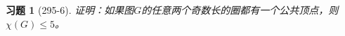 \documentclass{article}
\begin{document}
\begin{CJK}{UTF8}{gbsn}
  \newtheorem*{Exercise}{习题}
  \huge
\begin{Exercise}[295-6]
  证明：如果图$G$的任意两个奇数长的圈都有一个公共顶点，则$\chi (G) \leq 5$。
\end{Exercise}

\end{CJK}
\end{document}
